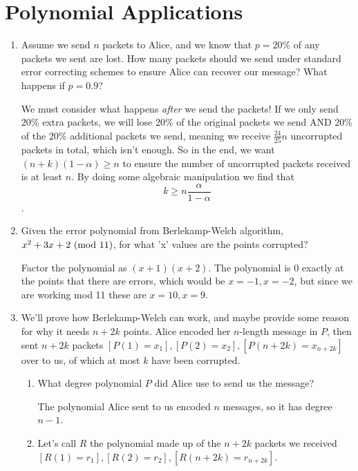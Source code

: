 \documentclass{article}
\begin{document}
    \section{Polynomial Applications}
    \begin{enumerate}
        \item Assume we send $n$ packets to Alice, and we know that $p = 20\%$ of any packets we sent are lost. How many packets should we send under standard error correcting schemes
        to ensure Alice can recover our message? What happens if $p=0.9$?
        \begin{solution}
            We must consider what happens \textit{after} we send the packets! If we only send $20\%$ extra packets, we will lose 20\% of the original packets we send AND 20\% of the 20\% additional packets we send, meaning we receive
            $\frac{24}{25}n$ uncorrupted packets in total, which isn't enough.
            So in the end, we want $(n+k)(1 - \alpha) \geq n$ to ensure the number of uncorrupted packets received is at least $n$.
            By doing some algebraic manipulation we find that 
            \[ k \geq n \frac{\alpha}{1 - \alpha}\].
        \end{solution}
        \item Given the error polynomial from Berlekamp-Welch algorithm, $x^2 + 3x + 2 \textnormal{ (mod } 11)$, for what ’x’ values are the points corrupted?
        \begin{solution}
            Factor the polynomial as $(x + 1)(x+2)$. The polynomial is 0 exactly at the points that there are errors, which would be $x = -1, x = -2$, but since we are working mod 11 these are $x = 10, x = 9$.
        \end{solution}
        \item We'll prove how Berlekamp-Welch can work, and maybe provide some reason for why it needs $n+2k$ points. Alice encoded her $n$-length message in $P$, then sent
        $n+2k$ packets $[P(1) = x_1], [P(2) = x_2], [P(n+2k)=x_{n+2k}]$ over to us, of which at most $k$ have been corrupted.
        \begin{enumerate}
            \item What degree polynomial $P$ did Alice use to send us the message?
            \begin{solution}
                The polynomial Alice sent to us encoded $n$ messages, so it has degree $n-1$.
            \end{solution}
            \item Let's call $R$ the polynomial made up of the $n+2k$ packets we received $[R(1) = r_1], [R(2) = r_2], [R(n+2k)=r_{n+2k}]$.

\end{enumerate}
\end{enumerate}
\end{document}
